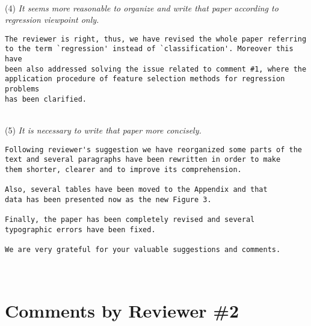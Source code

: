 \documentclass[preprint]{elsarticle}
\begin{document}
~\\
\noindent (4) \emph{It seems more reasonable to organize and write that paper according to regression viewpoint only. } 

\begin{verbatim}
The reviewer is right, thus, we have revised the whole paper referring 
to the term `regression' instead of `classification'. Moreover this have 
been also addressed solving the issue related to comment #1, where the
application procedure of feature selection methods for regression problems 
has been clarified. 
\end{verbatim}

~\\
\noindent (5) \emph{It is necessary to write that paper more concisely. } 

\begin{verbatim}
Following reviewer's suggestion we have reorganized some parts of the 
text and several paragraphs have been rewritten in order to make 
them shorter, clearer and to improve its comprehension. 

Also, several tables have been moved to the Appendix and that
data has been presented now as the new Figure 3.

Finally, the paper has been completely revised and several 
typographic errors have been fixed. 

We are very grateful for your valuable suggestions and comments. 
\end{verbatim}


~\\

\section{Comments by Reviewer \#2}
\end{document}
